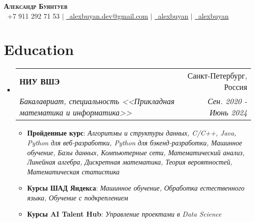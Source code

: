 \documentclass[english,russian,letterpaper,11pt]{article}
\makeatletter
\newcommand{\resumeItem}[1]{
  \item\small{
    {#1 \vspace{-2pt}}
  }
}
\newcommand{\resumeSubheading}[4]{
  \vspace{-2pt}\item
    \begin{tabular*}{0.97\textwidth}[t]{l@{\extracolsep{\fill}}r}
      \textbf{#1} & #2 \\
      \textit{\small#3} & \textit{\small #4} \\
    \end{tabular*}\vspace{-7pt}
}
\newcommand{\resumeSubHeadingListStart}{\begin{itemize}[leftmargin=0.15in, label={}]}
\newcommand{\resumeSubHeadingListEnd}{\end{itemize}}
\newcommand{\resumeItemListStart}{\begin{itemize}}
\newcommand{\resumeItemListEnd}{\end{itemize}\vspace{-5pt}}
\makeatother
\begin{document}

\begin{center}
    \textbf{\Huge \scshape Александр Буянтуев} \\ \vspace{2pt}
    \small \faPhone \ +7 911 292 71 53 $|$ \href{mailto:alexbuyan.dev@gmail.com}{\faEnvelope \ \underline{alexbuyan.dev@gmail.com}} $|$ 
    \href{https://github.com/alexbuyan}{\faGithub \ \underline{alexbuyan}} $|$ \href{https://www.linkedin.com/in/alexander-buyantuev-063785223}{\faLinkedin \ \underline{alexbuyan}}
\end{center}


\section{Education}
  \resumeSubHeadingListStart
    \resumeSubheading
      {НИУ ВШЭ}{Санкт-Петербург, Россия}
      {Бакалавриат, специальность <<Прикладная математика и информатика>>}{Сен. 2020 - Июнь 2024}
      \resumeItemListStart
        \resumeItem{\textbf{Пройденные курс}: \textit{Алгоритмы и структуры данных, C/C++, Java, Python для веб-разработки, Python для бэкенд-разработки, Машинное обучение, Базы данных, Компьютерные сети, Математический анализ, Линейная алгебра, Дискретная математика, Теория вероятностей, Математическая статистика}}
        \resumeItem{\textbf{Курсы ШАД Яндекса}: \textit{Машинное обучение, Обработка естественного языка, Обучение с подкреплением}}
        \resumeItem{\textbf{Курсы AI Talent Hub}: \textit{Управление проектами в Data Science}}
      \resumeItemListEnd
  \resumeSubHeadingListEnd

\end{document}
